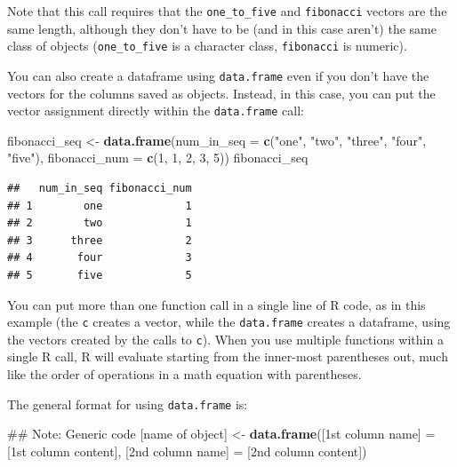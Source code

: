 \documentclass[]{book}
\makeatletter
\newenvironment{Shaded}{\begin{snugshade}}{\end{snugshade}}
\newcommand{\KeywordTok}[1]{\textcolor[rgb]{0.13,0.29,0.53}{\textbf{{#1}}}}
\newcommand{\DataTypeTok}[1]{\textcolor[rgb]{0.13,0.29,0.53}{{#1}}}
\newcommand{\DecValTok}[1]{\textcolor[rgb]{0.00,0.00,0.81}{{#1}}}
\newcommand{\StringTok}[1]{\textcolor[rgb]{0.31,0.60,0.02}{{#1}}}
\newcommand{\NormalTok}[1]{{#1}}
\newenvironment{kframe}{%
\medskip{}
\setlength{\fboxsep}{.8em}
 \def\at@end@of@kframe{}%
 \ifinner\ifhmode%
  \def\at@end@of@kframe{\end{minipage}}%
  \begin{minipage}{\columnwidth}%
 \fi\fi%
 \def\FrameCommand##1{\hskip\@totalleftmargin \hskip-\fboxsep
 \colorbox{shadecolor}{##1}\hskip-\fboxsep
     \hskip-\linewidth \hskip-\@totalleftmargin \hskip\columnwidth}%
 \MakeFramed {\advance\hsize-\width
   \@totalleftmargin\z@ \linewidth\hsize
   \@setminipage}}%
 {\par\unskip\endMakeFramed%
 \at@end@of@kframe}
\renewenvironment{Shaded}{\begin{kframe}}{\end{kframe}}
\newenvironment{rmdblock}[1]
  {
  \begin{itemize}
  \renewcommand{\labelitemi}{
    \raisebox{-.7\height}[0pt][0pt]{
      {\setkeys{Gin}{width=3em,keepaspectratio}\texttt{[image: images/\#1]}}
    }
  }
  \setlength{\fboxsep}{1em}
  \begin{kframe}
  \item
  }
  {
  \end{kframe}
  \end{itemize}
  }
\newenvironment{rmdnote}
  {\begin{rmdblock}{note}}
  {\end{rmdblock}}
\makeatother
\begin{document}
Note that this call requires that the \texttt{one\_to\_five} and
\texttt{fibonacci} vectors are the same length, although they don't have
to be (and in this case aren't) the same class of objects
(\texttt{one\_to\_five} is a character class, \texttt{fibonacci} is
numeric).

You can also create a dataframe using \texttt{data.frame} even if you
don't have the vectors for the columns saved as objects. Instead, in
this case, you can put the vector assignment directly within the
\texttt{data.frame} call:

\begin{Shaded}
\begin{Highlighting}[]
\NormalTok{fibonacci_seq <-}\StringTok{ }\KeywordTok{data.frame}\NormalTok{(}\DataTypeTok{num_in_seq =} \KeywordTok{c}\NormalTok{(}\StringTok{"one"}\NormalTok{, }\StringTok{"two"}\NormalTok{, }\StringTok{"three"}\NormalTok{,}
                                           \StringTok{"four"}\NormalTok{, }\StringTok{"five"}\NormalTok{),}
                            \DataTypeTok{fibonacci_num =} \KeywordTok{c}\NormalTok{(}\DecValTok{1}\NormalTok{, }\DecValTok{1}\NormalTok{, }\DecValTok{2}\NormalTok{, }\DecValTok{3}\NormalTok{, }\DecValTok{5}\NormalTok{))}
\NormalTok{fibonacci_seq}
\end{Highlighting}
\end{Shaded}

\begin{verbatim}
##   num_in_seq fibonacci_num
## 1        one             1
## 2        two             1
## 3      three             2
## 4       four             3
## 5       five             5
\end{verbatim}

\begin{rmdnote}
You can put more than one function call in a single line of R code, as
in this example (the \texttt{c} creates a vector, while the
\texttt{data.frame} creates a dataframe, using the vectors created by
the calls to \texttt{c}). When you use multiple functions within a
single R call, R will evaluate starting from the inner-most parentheses
out, much like the order of operations in a math equation with
parentheses.
\end{rmdnote}

The general format for using \texttt{data.frame} is:

\begin{Shaded}
\begin{Highlighting}[]
\NormalTok{## Note: Generic code}
\NormalTok{[name of object] <-}\StringTok{ }\KeywordTok{data.frame}\NormalTok{([1st column name] =}\StringTok{ }\NormalTok{[1st column content],}
                               \NormalTok{[2nd column name] =}\StringTok{ }\NormalTok{[2nd column content])}
\end{Highlighting}
\end{Shaded}
\end{document}
